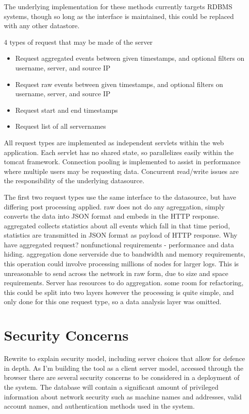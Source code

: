 The underlying implementation for these methods currently targets RDBMS systems, though so long as the interface is maintained, this could be replaced with any other datastore.

4 types of request that may be made of the server
\begin{itemize}
\item{Request aggregated events between given timestamps, and optional filters on username, server, and source IP}
\item{Request raw events between given timestamps, and optional filters on username, server, and source IP}
\item{Request start and end timestamps}
\item{Request list of all servernames}
\end{itemize}

All request types are implemented as independent servlets within the web application. Each servlet has no shared state, so parallelizes easily within the tomcat framework. Connection pooling is implemented to assist in performance where multiple users may be requesting data. Concurrent read/write issues are the responsibility of the underlying datasource.

The first two request types use the same interface to the datasource, but have differing post processing applied. raw does not do any agreggation, simply converts the data into JSON format and embeds in the HTTP response. aggregated collects statistics about all events which fall in that time period, statistics are transmitted in JSON format as payload of HTTP response.
Why have aggregated request? nonfunctional requirements - performance and data hiding. aggregation done serverside due to bandwidth and memory requirements, this operation could involve processing millions of nodes for larger logs. This is unreasonable to send across the network in raw form, due to size and space requirements. Server has resources to do aggregation. 
some room for refactoring, this could be split into two layers
however the processing is quite simple, and only done for this one request type, so a data analysis layer was omitted.

\section{Security Concerns}
Rewrite to explain security model, including server choices that allow for defence in depth.
As I'm building the tool as a client server model, accessed through the browser
there are several security concerns to be considered in a deployment of the system.
The database will contain a significant amount of privileged information about network security
such as machine names and addresses, valid account names, and authentication methods used in the system.

